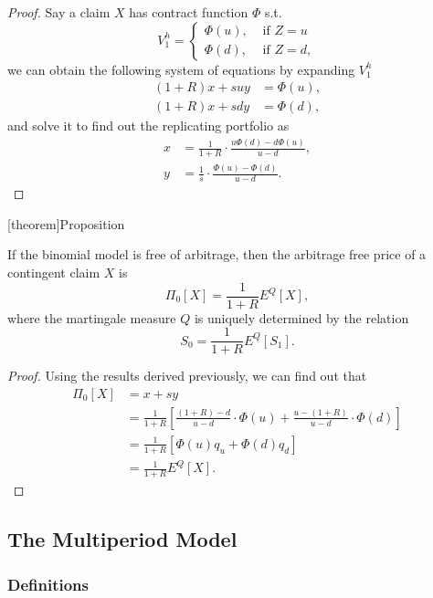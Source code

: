 \documentclass[twocolumn,landscape,10pt]{article}
\theoremstyle{definition}
\begin{document}
\begin{proof}
    Say a claim $X$ has contract function $\Phi$ s.t. \[
        V_1^h=
        \begin{cases}
            \Phi(u), & \text{ if $Z=u$}\\
            \Phi(d), & \text{ if $Z=d$},
        \end{cases}
    \]
    we can obtain the following system of equations by expanding $V_1^h$
    \begin{align*}
        (1+R)x+suy&=\Phi(u),\\
        (1+R)x+sdy&=\Phi(d),
    \end{align*}
    and solve it to find out the replicating portfolio as
    \begin{align*}
        x&=\frac{1}{1+R}\cdot \frac{u\Phi(d)-d\Phi(u)}{u-d},\\
        y&=\frac{1}{s}\cdot \frac{\Phi(u)-\Phi(d)}{u-d}.
    \end{align*}
\end{proof}

[theorem]{Proposition}
\begin{claim pricing prop}
    If the binomial model is free of arbitrage, then the arbitrage free price of
    a contingent claim $X$ is
    \[
        \Pi_0[X]=\frac{1}{1+R}E^Q[X],
    \]
    where the martingale measure $Q$ is uniquely determined by the relation
    \[
        S_0=\frac{1}{1+R}E^Q[S_1].
    \]
\end{claim pricing prop}

\begin{proof}
    Using the results derived previously, we can find out that
    \begin{align*}
        \Pi_0[X]
        &= x + sy \\
        &= \frac{1}{1+R}\left[\frac{(1+R)-d}{u-d}\cdot
        \Phi(u)+\frac{u-(1+R)}{u-d}\cdot \Phi(d)\right]\\
        &= \frac{1}{1+R}\left[\Phi(u)q_u+\Phi(d)q_d\right]\\
        &= \frac{1}{1+R}E^Q[X].
    \end{align*}
\end{proof}

\subsection{The Multiperiod Model}

\subsubsection{Definitions}
\end{document}
